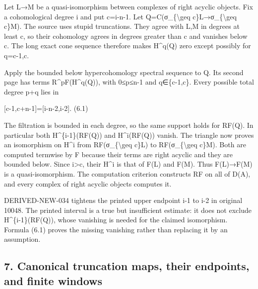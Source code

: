 \documentclass[11pt]{article}
\begin{document}
Let L\allowbreak{}→M be a quasi-isomorphism between complexes of right acyclic objects. Fix a cohomological degree i and put c\allowbreak{}=i-n-1. Let Q\allowbreak{}=C(σ\_\allowbreak{}\{\textbackslash{}geq c\}L\allowbreak{}→σ\_\allowbreak{}\{\textbackslash{}geq c\}M)\allowbreak{}. The source uses stupid truncations. They agree with L,\allowbreak{}M in degrees at least c,\allowbreak{} so their cohomology agrees in degrees greater than c and vanishes below c. The long exact cone sequence therefore makes H\textasciicircum{}q(Q)\allowbreak{} zero except possibly for q\allowbreak{}=c-1,\allowbreak{}c.

Apply the bounded below hypercohomology spectral sequence to Q. Its second page has terms R\textasciicircum{}pF(H\textasciicircum{}q(Q)\allowbreak{})\allowbreak{},\allowbreak{} with 0≤p≤n-1 and q\allowbreak{}∈\{c-1,\allowbreak{}c\}. Every possible total degree p\allowbreak{}+q lies in

[c-1,\allowbreak{}c\allowbreak{}+n-1]\allowbreak{}\allowbreak{}=[i-n-2,\allowbreak{}i-2]\allowbreak{}. (6.1)\allowbreak{}

The filtration is bounded in each degree,\allowbreak{} so the same support holds for RF(Q)\allowbreak{}. In particular both H\textasciicircum{}\{i-1\}(RF(Q)\allowbreak{})\allowbreak{} and H\textasciicircum{}i(RF(Q)\allowbreak{})\allowbreak{} vanish. The triangle now proves an isomorphism on H\^{}i from RF(σ\_\allowbreak{}\{\textbackslash{}geq c\}L)\allowbreak{} to RF(σ\_\allowbreak{}\{\textbackslash{}geq c\}M)\allowbreak{}. Both are computed termwise by F because their terms are right acyclic and they are bounded below. Since i>c,\allowbreak{} their H\^{}i is that of F(L)\allowbreak{} and F(M)\allowbreak{}. Thus F(L)\allowbreak{}\allowbreak{}→F(M)\allowbreak{} is a quasi-isomorphism. The computation criterion constructs RF on all of D(A)\allowbreak{},\allowbreak{} and every complex of right acyclic objects computes it.

DERIVED-NEW-034 tightens the printed upper endpoint i-1 to i-2 in original 10048. The printed interval is a true but insufficient estimate:\allowbreak{} it does not exclude H\textasciicircum{}\{i-1\}(RF(Q)\allowbreak{})\allowbreak{},\allowbreak{} whose vanishing is needed for the claimed isomorphism. Formula (6.1)\allowbreak{} proves the missing vanishing rather than replacing it by an assumption.

\subsection{\texorpdfstring{7. Canonical truncation maps,\allowbreak{} their endpoints,\allowbreak{} and finite windows}{7. Canonical truncation  their  and finite windows}}\label{proofs-9746-10132-canonical-truncation-maps-their-endpoints-and-finite-windows}
\end{document}
